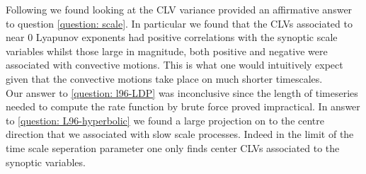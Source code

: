 Following \cite{Vannitsem2016} we found looking at the CLV variance provided an affirmative answer to question \ref{question: scale}. In particular we found that the CLVs associated to near $0$ Lyapunov exponents had positive correlations with the synoptic scale variables whilst those large in magnitude, both positive and negative were associated with convective motions. This is what one would intuitively expect given that the convective motions take place on much shorter timescales.\\

Our answer to \ref{question: l96-LDP} was inconclusive since the length of timeseries needed to compute the rate function by brute force proved impractical. In answer to \ref{question: L96-hyperbolic} we found a large projection on to the centre direction that we associated with slow scale processes. Indeed in the limit of the time scale seperation parameter one only finds center CLVs associated to the synoptic variables.
